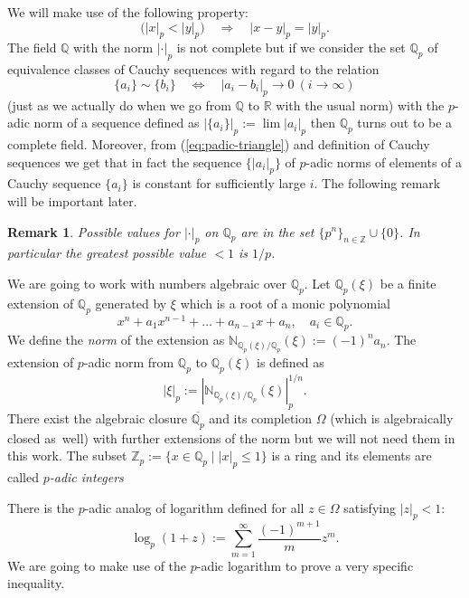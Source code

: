 \documentclass[12pt, a4paper]{amsart}
\def\R{{\mathbb R}}
\def\Z{{\mathbb Z}}
\def\Q{{\mathbb Q}}
\newtheorem{remark}[theorem]{Remark}
\def\N{{\mathbb N}}
\begin{document}
We will make use of the following property:
\begin{equation}\label{eq:padic-triangle}
  \big( |x|_p < |y|_p \big) \quad \Longrightarrow \quad |x-y|_p = |y|_p.
\end{equation}
The field $\Q$ with the norm $|\cdot|_p$ is not complete but if we consider the set $\Q_p$
of equivalence classes of Cauchy sequences with regard to the relation
\[
  \{a_i\} \sim \{b_i\} \quad \Longleftrightarrow \quad |a_i - b_i|_p \to 0 \ (i \to \infty)
\]
(just as we actually do when we go from $\Q$ to $\R$ with the usual norm)
with the $p$-adic norm of a sequence defined as $\left|\{a_i\}\right|_p := \lim |a_i|_p$
then $\Q_p$ turns out to be a complete field.
Moreover, from (\ref{eq:padic-triangle}) and definition of Cauchy sequences we get
that in fact the sequence $\{|a_i|_p\}$ of $p$-adic norms of elements of a Cauchy sequence $\{a_i\}$
is constant for sufficiently large $i$.
The following remark will be important later.
\begin{remark}\label{thm:possible-values-of-padic-norm}
  Possible values for $|\cdot|_p$ on $\Q_p$ are in the set $\{p^n\}_{n \in \Z} \cup \{0\}$.
  In particular the greatest possible value $<1$ is $1/p$.
\end{remark}

We are going to work with numbers algebraic over $\Q_p$.
Let $\Q_p(\xi)$ be a finite extension of $\Q_p$ generated by $\xi$ which is a root of a monic polynomial
\[
  x^n + a_1 x^{n-1} + \dots + a_{n-1} x + a_n, \quad a_i \in \Q_p.
\]
We define the \emph{norm} of the extension as $\N_{\Q_p(\xi)/\Q_p}(\xi) := (-1)^n a_n$.
The extension of $p$-adic norm from $\Q_p$ to $\Q_p(\xi)$ is defined as
\[
  |\xi|_p := \left| \N_{\Q_p(\xi)/\Q_p}(\xi) \right|_p^{1/n}.
\]
There exist the algebraic closure $\overline{\Q_p}$ and its completion $\Omega$ (which is algebraically
closed as~well) with further extensions of the norm but we will not need them in this work.
The subset $\Z_p := \{ x \in \Q_p \mid |x|_p \leq 1 \}$ is a ring
and its elements are called \emph{$p$-adic integers}

There is the $p$-adic analog of logarithm defined for all $z \in \Omega$ satisfying $|z|_p < 1$:
\begin{equation*}
  \log_p(1+z) := \sum_{m=1}^{\infty} \frac{(-1)^{m+1}}{m} z^m.
\end{equation*}
We are going to make use of the $p$-adic logarithm to prove a very specific inequality.
\end{document}
